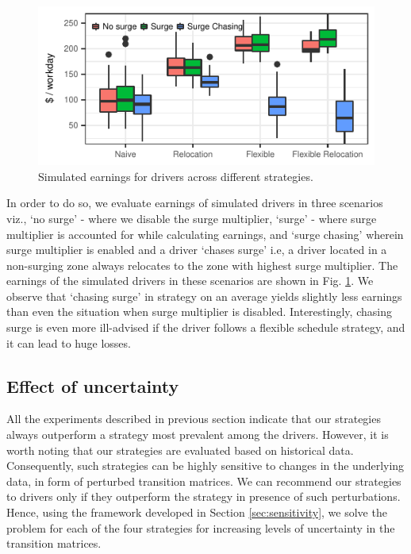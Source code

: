 \begin{figure}[H]
	\includegraphics{figures/simulated_earnings.pdf}
	\caption{Simulated earnings for drivers across different strategies.}
	\label{fig:simulated_earnings}
\end{figure}
In order to do so, we evaluate earnings of simulated drivers in three scenarios viz., `no surge' - where we disable the surge multiplier, `surge' - where surge multiplier is accounted for while calculating earnings, and `surge chasing' wherein surge multiplier is enabled and a driver `chases surge' i.e, a driver located in a non-surging zone always relocates to the zone with highest surge multiplier. The earnings of the simulated drivers in these scenarios are shown in Fig. {\ref{fig:simulated_earnings}}. We observe that `chasing surge' in {\naive} strategy on an average yields slightly less earnings than even the situation when surge multiplier is disabled. Interestingly, chasing surge is even more ill-advised if the driver follows a flexible schedule strategy, and it can lead to huge losses.

\subsection{Effect of uncertainty} 

All the experiments described in previous section indicate that our strategies always outperform a {\naive} strategy most prevalent among the drivers. However, it is worth noting that our strategies are evaluated based on historical data. Consequently, such strategies can be highly sensitive to changes in the underlying data, in form of perturbed transition matrices. We can recommend our strategies to drivers only if they outperform the {\naive} strategy in presence of such perturbations. Hence, using the framework developed in Section \ref{sec:sensitivity}, we solve the {\robustproblem} problem for each of the four strategies for increasing levels of uncertainty in the transition matrices.

